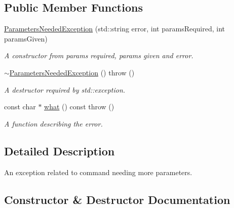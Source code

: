 \subsection*{Public Member Functions}
\begin{DoxyCompactItemize}
\item 
\hyperlink{class_r_c_f_1_1_common_1_1_parameters_needed_exception_a6d5eb91489f48b7b7749799a2fbb5eb6}{Parameters\+Needed\+Exception} (std\+::string error, int params\+Required, int params\+Given)
\begin{DoxyCompactList}\small\item\em A constructor from params required, params given and error. \end{DoxyCompactList}\item 
\hypertarget{class_r_c_f_1_1_common_1_1_parameters_needed_exception_a20c868291a78bb9775a343f37b21f1d2}{}\hyperlink{class_r_c_f_1_1_common_1_1_parameters_needed_exception_a20c868291a78bb9775a343f37b21f1d2}{$\sim$\+Parameters\+Needed\+Exception} ()  throw ()\label{class_r_c_f_1_1_common_1_1_parameters_needed_exception_a20c868291a78bb9775a343f37b21f1d2}

\begin{DoxyCompactList}\small\item\em A destructor required by std\+::exception. \end{DoxyCompactList}\item 
const char $\ast$ \hyperlink{class_r_c_f_1_1_common_1_1_parameters_needed_exception_a3642a2d5054ca4f1ff3ba76f3c51cf8d}{what} () const   throw ()
\begin{DoxyCompactList}\small\item\em A function describing the error. \end{DoxyCompactList}\end{DoxyCompactItemize}


\subsection{Detailed Description}
An exception related to command needing more parameters. 

\subsection{Constructor \& Destructor Documentation}
\hypertarget{class_r_c_f_1_1_common_1_1_parameters_needed_exception_a6d5eb91489f48b7b7749799a2fbb5eb6}{}
